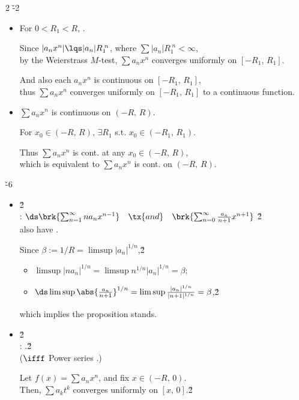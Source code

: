 \documentclass[dvipdfmx,a4paper,titlepage,9pt]{jsarticle}
\begin{document}
\begin{multicols*}{2}
\v{-2}
\begin{itemize}[label={-}]
\item For $0<R_1<R$, .
\begin{Pfbox}
Since $|a_nx^n|\lqs|a_n|R_1^{\;n}$, where $\sum|a_n|R_1^{\;n}<\infty$,\\
by the Weierstrass $M$-test, $\sum a_nx^n$ converges uniformly on $[-R_1,\,R_1]$.

\;\;And also each $a_nx^n$ is continuous on $[-R_1,\,R_1]$, \\
thus $\sum a_nx^n$ converges uniformly on $[-R_1,\,R_1]$ to a continuous function.
\end{Pfbox} \;

\item $\sum a_nx^n$ is continuous on $(-R,\,R)$.
\begin{Pfbox}
For $x_0\in(-R,\,R)$, $\exists R_1$ s.t. $x_0\in(-R_1,\,R_1)$.

\;\;Thus $\sum a_nx^n$ is cont. at any $x_0\in(-R,\,R)$,\\
which is equivalent to $\sum a_nx^n$ is cont. on $(-R,\,R)$.
\end{Pfbox} \;
\end{itemize}

\v{-6}
\begin{itemize}[label={-}]
\item{}\v2\\
: $\ds\brk{\sum_{n=1}^\infty na_nx^{n-1}}\quad\tx{and}\quad\brk{\sum_{n=0}^\infty\frac{a_n}{n+1}x^{n+1}}$ \v2\\
\;\;also have .
\begin{Pfbox}
Since $\beta:=1/R=\limsup{}|a_n|^{1/n}$,\v2
\begin{itemize}
\setlength{\leftskip}{-5pt}
\item[(i)] $\limsup{}|na_n|^{1/n}=\limsup n^{1/n}|a_n|^{1/n}=\beta$;
\item[(ii)] $\ds\limsup{}\abs{\frac{a_n}{n+1}}^{1/n}=\limsup\frac{|a_n|^{1/n}}{|n+1|^{1/n}}=\beta$,\v2
\end{itemize}
which implies the proposition stands.
\end{Pfbox} \;

\vfill\null\columnbreak

\item{}\v2\\
\!\!: \!.\v2\\
($\ifff$ Power series .)
\begin{Pfbox}
Let $f(x)=\sum a_nx^n$, and fix $x\in(-R,\,0)$. \\
Then, $\sum a_kt^k$ converges uniformly on $[x,\,0]$.\v2


\end{Pfbox}
\end{itemize}
\end{multicols*}
\end{document}
